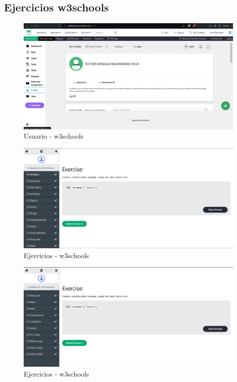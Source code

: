 \documentclass{article}
\begin{document}
	\subsection{Ejercicios w3schools}
	\begin{figure}[H]
		\centering
		\includegraphics[width=1\textwidth,keepaspectratio]{img/w3_user.png}
		\caption{Usuario - w3schools}
	\end{figure}
	\begin{figure}[H]
		\centering
		\includegraphics[width=1\textwidth,keepaspectratio]{img/EjerP1.png}
		\caption{Ejercicios - w3schools}
	\end{figure}
	\begin{figure}[H]
		\centering
		\includegraphics[width=1\textwidth,keepaspectratio]{img/EjerP2.png}
		\caption{Ejercicios - w3schools}
	\end{figure}
\end{document}
